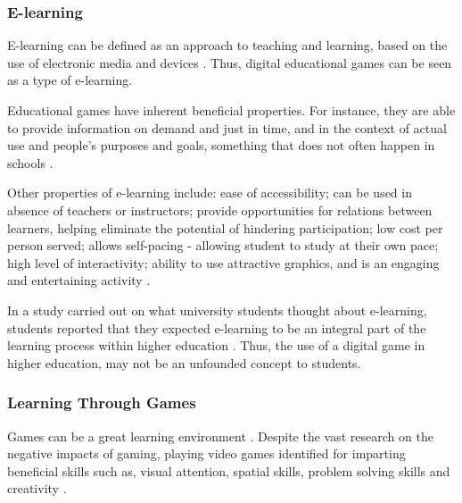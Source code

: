 \documentclass[a4paper,11.5pt]{report}
\numberwithin{figure}{section}
\numberwithin{table}{section}
\numberwithin{equation}{section}
\numberwithin{equation}{section}
\begin{document}
\subsubsection{E-learning}

E-learning can be defined as an approach to teaching and learning, based on the use of electronic media and devices \citep{sangra2012}. Thus, digital educational games can be seen as a type of e-learning.

Educational games have inherent beneficial properties. For instance, they are able to provide information on demand and just in time, and in the context of actual use and people's purposes and goals, something that does not often happen in schools \citep{Gee2003}.

Other properties of e-learning include: ease of accessibility; can be used in absence of teachers or instructors; provide opportunities for relations between learners, helping eliminate the potential of hindering participation; low cost per person served; allows self-pacing - allowing student to study at their own pace; high level of interactivity; ability to use attractive graphics, and is an engaging and entertaining activity \citep{arkorful2015, Girard2013}.

In a study carried out on what university students thought about e-learning, students reported that they expected e-learning to be an integral part of the learning process within higher education \citep{Connolly2012}. Thus, the use of a digital game in higher education, may not be an unfounded concept to students.



\subsubsection{Learning Through Games}


Games can be a great learning environment \citep[see][]{prensky2003, Gee2003}. Despite the vast research on the negative impacts of gaming, playing video games identified for imparting beneficial skills such as, visual attention, spatial skills, problem solving skills and creativity \citep{Granic2014}. 
\end{document}

